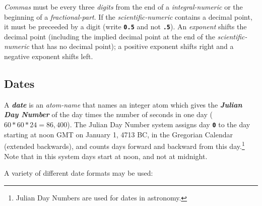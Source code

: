 \documentclass[12pt]{article}
\newcommand{\TT}[1]{{\tt \bfseries #1}}
\newcommand{\key}[1]{{\bf \em #1}\index{#1}}
\begin{document}
{\em Commas} must be every three {\em digits} from the end of
a {\em integral-numeric} or the beginning of a {\em fractional-part}.
If the {\em scientific-numeric} contains a decimal point, it must
be preceeded by a digit (write \TT{0.5} and not \TT{.5}).
An {\em exponent} shifts the decimal point (including the implied
decimal point at the end of the {\em scientific-numeric} that has
no decimal point); a positive exponent shifts right and a negative
exponent shifts left.

\subsection{Dates}
\label{DATES}

A \key{date} is an {\em atom-name} that names an integer atom
which gives the \key{Julian Day Number} of the day times
the number of seconds in one day ($60*60*24=86,400$).
The Julian Day Number system assigns day \TT{0} to the day starting
at noon GMT on January 1, 4713 BC, in the Gregorian Calendar (extended
backwards), and counts days forward and backward
from this day.\footnote{Julian Day Numbers are used for dates in astronomy.}
Note that in this system days start at noon, and not at midnight.

A variety of different date formats may be used:
\end{document}
